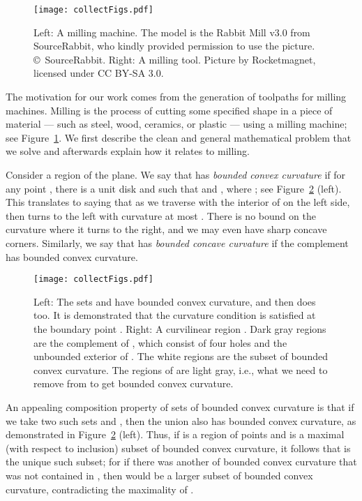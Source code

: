 \documentclass{article}
\begin{document}
\begin{figure}
\centering
\texttt{[image: collectFigs.pdf]}
\caption{Left: A milling machine.
The model is the Rabbit Mill v3.0 from SourceRabbit, who kindly provided permission to use the picture.
\copyright\ SourceRabbit.
Right: A milling tool. Picture by Rocketmagnet, licensed under CC BY-SA 3.0.}
\label{millFig}
\end{figure}

The motivation for our work comes from the generation of toolpaths for milling machines.
Milling is the process of cutting some specified shape in a piece of material --- such as steel, wood, ceramics, or plastic --- using a milling machine; see Figure~\ref{millFig}.
We first describe the clean and general mathematical problem that we solve and afterwards explain how it relates to milling.

Consider a region  of the plane. 
We say that  has \emph{bounded convex curvature} if for any point , there is a unit disk  and  such that  and , where ; see Figure~\ref{compositionFig} (left).
This translates to saying that as we traverse  with the interior of  on the left side, then  turns to the left with curvature at most .
There is no bound on the curvature where it turns to the right, and we may even have
sharp concave corners.
Similarly, we say that  has \emph{bounded concave curvature} if the complement  has bounded convex curvature.

\begin{figure}
\centering
\texttt{[image: collectFigs.pdf]}
\caption{Left: The sets  and  have bounded convex curvature, and then  does too.
It is demonstrated that the curvature condition is satisfied at the boundary point .
Right: A curvilinear region .
Dark gray regions are the complement of , which consist of four holes and the unbounded exterior of .
The white regions are the subset  of bounded convex curvature.
The regions of  are light gray, i.e., what we need to remove from  to get bounded convex curvature.}
\label{compositionFig}
\end{figure}

An appealing composition property of sets of bounded convex curvature is that if we take two such sets  and , then the union  also has bounded convex curvature, as demonstrated in Figure~\ref{compositionFig} (left).
Thus, if  is a region of points and  is a maximal (with respect to inclusion) subset of bounded convex curvature, it follows that  is the unique such subset; for if there was another  of bounded convex curvature that was not contained in , then  would be a larger subset of bounded convex curvature, contradicting the maximality of .
\end{document}
